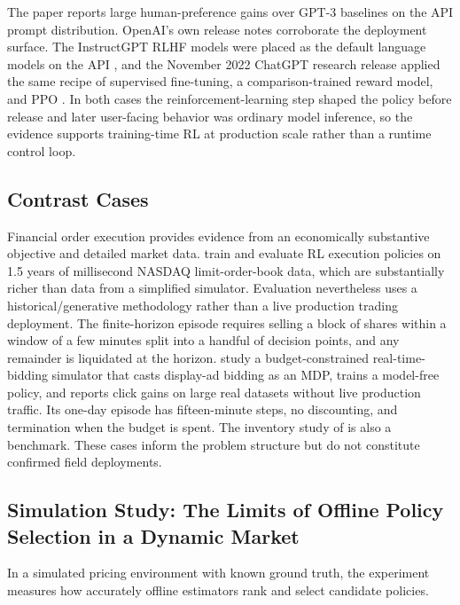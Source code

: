 The paper reports large human-preference gains over GPT-3 baselines on the API prompt distribution. OpenAI's own release notes corroborate the deployment surface. The InstructGPT RLHF models were placed as the default language models on the API \citep{OpenAI2022InstructGPTPost}, and the November 2022 ChatGPT research release applied the same recipe of supervised fine-tuning, a comparison-trained reward model, and PPO \citep{OpenAI2022ChatGPTPost}. In both cases the reinforcement-learning step shaped the policy before release and later user-facing behavior was ordinary model inference, so the evidence supports training-time RL at production scale rather than a runtime control loop.

\subsection{Contrast Cases}
\label{sec:execution}

Financial order execution provides evidence from an economically substantive objective and detailed market data. \citet{Nevmyvaka2006execution} train and evaluate RL execution policies on 1.5 years of millisecond NASDAQ limit-order-book data, which are substantially richer than data from a simplified simulator. Evaluation nevertheless uses a historical/generative methodology rather than a live production trading deployment. The finite-horizon episode requires selling a block of shares within a window of a few minutes split into a handful of decision points, and any remainder is liquidated at the horizon. \citet{Wu2018rtb} study a budget-constrained real-time-bidding simulator that casts display-ad bidding as an MDP, trains a model-free policy, and reports click gains on large real datasets without live production traffic. Its one-day episode has fifteen-minute steps, no discounting, and termination when the budget is spent. The inventory study of \citet{Gijsbrechts2022inventory} is also a benchmark. These cases inform the problem structure but do not constitute confirmed field deployments.

\subsection{Simulation Study: The Limits of Offline Policy Selection in a Dynamic Market}
\label{sec:field_ope_sim}


In a simulated pricing environment with known ground truth, the experiment measures how accurately offline estimators rank and select candidate policies.


